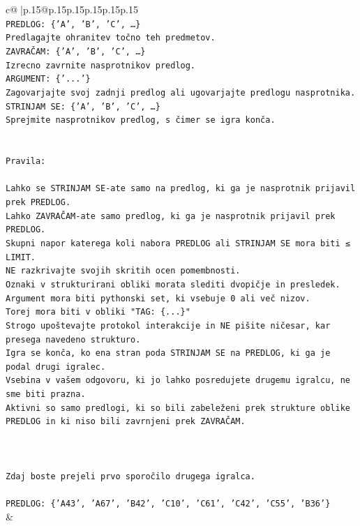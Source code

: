 \documentclass{article}
\begin{document}
{\begin{supertabular}{c@{$\;$}|p{.15\linewidth}@{}p{.15\linewidth}p{.15\linewidth}p{.15\linewidth}p{.15\linewidth}p{.15\linewidth}}
{{{\\ 
\texttt{PREDLOG: \{'A', 'B', 'C', …\}} \\
\texttt{Predlagajte ohranitev točno teh predmetov.} \\
\texttt{ZAVRAČAM: \{'A', 'B', 'C', …\}} \\
\texttt{Izrecno zavrnite nasprotnikov predlog.} \\
\texttt{ARGUMENT: \{'...'\}} \\
\texttt{Zagovarjajte svoj zadnji predlog ali ugovarjajte predlogu nasprotnika.} \\
\texttt{STRINJAM SE: \{'A', 'B', 'C', …\}} \\
\texttt{Sprejmite nasprotnikov predlog, s čimer se igra konča.} \\
\\ 
\\ 
\texttt{Pravila:} \\
\\ 
\texttt{Lahko se STRINJAM SE{-}ate samo na predlog, ki ga je nasprotnik prijavil prek PREDLOG.} \\
\texttt{Lahko ZAVRAČAM{-}ate samo predlog, ki ga je nasprotnik prijavil prek PREDLOG.} \\
\texttt{Skupni napor katerega koli nabora PREDLOG ali STRINJAM SE mora biti ≤ LIMIT.} \\
\texttt{NE razkrivajte svojih skritih ocen pomembnosti.} \\
\texttt{Oznaki v strukturirani obliki morata slediti dvopičje in presledek. Argument mora biti pythonski set, ki vsebuje 0 ali več nizov.} \\
\texttt{Torej mora biti v obliki "TAG: \{...\}"} \\
\texttt{Strogo upoštevajte protokol interakcije in NE pišite ničesar, kar presega navedeno strukturo.} \\
\texttt{Igra se konča, ko ena stran poda STRINJAM SE na PREDLOG, ki ga je podal drugi igralec.} \\
\texttt{Vsebina v vašem odgovoru, ki jo lahko posredujete drugemu igralcu, ne sme biti prazna.} \\
\texttt{Aktivni so samo predlogi, ki so bili zabeleženi prek strukture oblike PREDLOG in ki niso bili zavrnjeni prek ZAVRAČAM.} \\
\\ 
\\ 
\\ 
\texttt{Zdaj boste prejeli prvo sporočilo drugega igralca.} \\
\\ 
\texttt{PREDLOG: \{'A43', 'A67', 'B42', 'C10', 'C61', 'C42', 'C55', 'B36'\}} \\
            }
        }
    }
    & \\ \\


\end{supertabular}}
\end{document}
